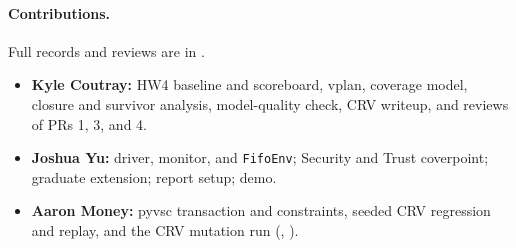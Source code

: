 \paragraph{Contributions.} Full records and reviews are in
.
\begin{itemize}
\item \textbf{Kyle Coutray:} HW4 baseline and scoreboard, vplan, coverage
model, closure and survivor analysis, model-quality check, CRV writeup, and
reviews of PRs 1, 3, and 4.
\item \textbf{Joshua Yu:} driver, monitor, and \texttt{FifoEnv}; Security and
Trust coverpoint; graduate extension; report setup; demo.
\item \textbf{Aaron Money:} pyvsc transaction and constraints, seeded CRV
regression and replay, and the CRV mutation run (,
).
\end{itemize}
